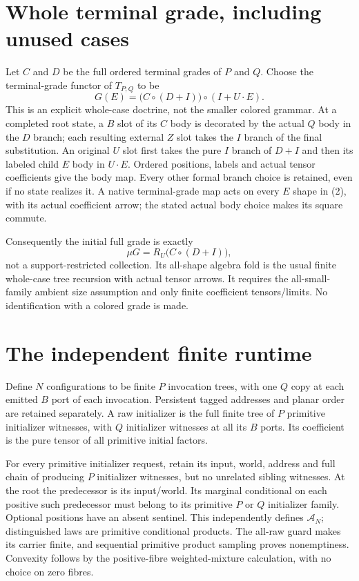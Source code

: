 \documentclass[11pt]{article}
\begin{document}
\section{Whole terminal grade, including unused cases}
Let $C$ and $D$ be the full ordered terminal grades of $P$ and $Q$. Choose the terminal-grade functor of $T_{P;Q}$ to be
\[
 G(E)=\bigl(C\circ(D+I)\bigr)\circ(I+U\cdot E).       \tag{2}
\]
This is an explicit whole-case doctrine, not the smaller colored grammar. At a completed root state, a $B$ slot of its $C$ body is decorated by the actual $Q$ body in the $D$ branch; each resulting external $Z$ slot takes the $I$ branch of the final substitution. An original $U$ slot first takes the pure $I$ branch of $D+I$ and then its labeled child $E$ body in $U\cdot E$. Ordered positions, labels and actual tensor coefficients give the body map. Every other formal branch choice is retained, even if no state realizes it. A native terminal-grade map acts on every $E$ shape in (2), with its actual coefficient arrow; the stated actual body choice makes its square commute.

Consequently the initial full grade is exactly
\[
 \mu G=R_U\bigl(C\circ(D+I)\bigr),                  \tag{3}
\]
not a support-restricted collection. Its all-shape algebra fold is the usual finite whole-case tree recursion with actual tensor arrows. It requires the all-small-family ambient size assumption and only finite coefficient tensors/limits. No identification with a colored grade is made.

\section{The independent finite runtime}
Define $N$ configurations to be finite $P$ invocation trees, with one $Q$ copy at each emitted $B$ port of each invocation. Persistent tagged addresses and planar order are retained separately. A raw initializer is the full finite tree of $P$ primitive initializer witnesses, with $Q$ initializer witnesses at all its $B$ ports. Its coefficient is the pure tensor of all primitive initial factors.

For every primitive initializer request, retain its input, world, address and full chain of producing $P$ initializer witnesses, but no unrelated sibling witnesses. At the root the predecessor is its input/world. Its marginal conditional on each positive such predecessor must belong to its primitive $P$ or $Q$ initializer family. Optional positions have an absent sentinel. This independently defines $\mathcal A_N$; distinguished laws are primitive conditional products. The all-raw guard makes its carrier finite, and sequential primitive product sampling proves nonemptiness. Convexity follows by the positive-fibre weighted-mixture calculation, with no choice on zero fibres.
\end{document}
